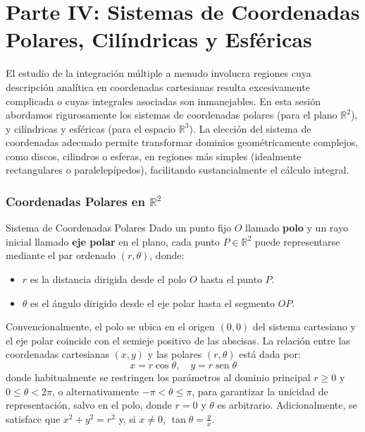 \documentclass[11pt,a4paper]{article}
\begin{document}
\part*{Parte IV: Sistemas de Coordenadas Polares, Cilíndricas y Esféricas}

El estudio de la integración múltiple a menudo involucra regiones cuya descripción analítica en coordenadas cartesianas resulta excesivamente complicada o cuyas integrales asociadas son inmanejables. En esta sesión abordamos rigurosamente los sistemas de coordenadas polares (para el plano $\mathbb{R}^2$), y cilíndricas y esféricas (para el espacio $\mathbb{R}^3$). La elección del sistema de coordenadas adecuado permite transformar dominios geométricamente complejos, como discos, cilindros o esferas, en regiones más simples (idealmente rectangulares o paralelepípedos), facilitando sustancialmente el cálculo integral.

\section{Coordenadas Polares en $\mathbb{R}^2$}

\begin{definicionbox}{Sistema de Coordenadas Polares}
Dado un punto fijo $O$ llamado \textbf{polo} y un rayo inicial llamado \textbf{eje polar} en el plano, cada punto $P \in \mathbb{R}^2$ puede representarse mediante el par ordenado $(r, \theta)$, donde:
\begin{itemize}
    \item $r$ es la distancia dirigida desde el polo $O$ hasta el punto $P$.
    \item $\theta$ es el ángulo dirigido desde el eje polar hasta el segmento $OP$.
\end{itemize}
Convencionalmente, el polo se ubica en el origen $(0,0)$ del sistema cartesiano y el eje polar coincide con el semieje positivo de las abscisas. La relación entre las coordenadas cartesianas $(x,y)$ y las polares $(r,\theta)$ está dada por:
\[ x = r \cos \theta, \quad y = r \operatorname{sen} \theta \]
donde habitualmente se restringen los parámetros al dominio principal $r \geq 0$ y $0 \leq \theta < 2\pi$, o alternativamente $-\pi < \theta \leq \pi$, para garantizar la unicidad de representación, salvo en el polo, donde $r=0$ y $\theta$ es arbitrario.
Adicionalmente, se satisface que $x^2 + y^2 = r^2$ y, si $x \neq 0$, $\tan \theta = \frac{y}{x}$.
\end{definicionbox}
\end{document}
